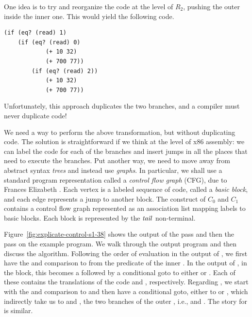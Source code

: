 \documentclass[11pt]{book}
\begin{document}
One idea is to try and reorganize the code at the level of $R_2$,
pushing the outer  inside the inner one. This would yield the
following code.
\begin{center}
\begin{minipage}{0.96\textwidth}
\begin{lstlisting}
(if (eq? (read) 1)
    (if (eq? (read) 0)
            (+ 10 32)
            (+ 700 77))
        (if (eq? (read) 2))
            (+ 10 32)
            (+ 700 77))
\end{lstlisting}
\end{minipage}
\end{center}
Unfortunately, this approach duplicates the two branches, and a
compiler must never duplicate code!

We need a way to perform the above transformation, but without
duplicating code. The solution is straightforward if we think at the
level of x86 assembly: we can label the code for each of the branches
and insert jumps in all the places that need to execute the
branches. Put another way, we need to move away from abstract syntax
\emph{trees} and instead use \emph{graphs}. In particular, we shall
use a standard program representation called a \emph{control flow
  graph} (CFG), due to Frances Elizabeth \citet{Allen:1970uq}.  Each
vertex is a labeled sequence of code, called a \emph{basic block}, and
each edge represents a jump to another block. The 
construct of $C_0$ and $C_1$ contains a control flow graph represented
as an association list mapping labels to basic blocks. Each block is
represented by the $\mathit{tail}$ non-terminal.

Figure~\ref{fig:explicate-control-s1-38} shows the output of the
 pass and then the
 pass on the example program. We walk through
the output program and then discuss the algorithm.
%
Following the order of evaluation in the output of
, we first have the  and
comparison to  from the predicate of the inner .  In
the output of , in the  block,
this becomes a  followed by a conditional goto to either
 or . Each of these contains the
translations of the code  and , respectively. Regarding , we start with the
 and comparison to  and then have a conditional
goto, either to  or , which indirectly
take us to  and , the two branches of the
outer , i.e.,  and . The
story for  is similar.
\end{document}
